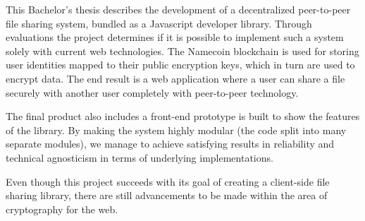 %

This Bachelor's thesis describes the development of a decentralized peer-to-peer file sharing system, bundled as a Javascript developer library. Through evaluations the project determines if it is possible to implement such a system solely with current web technologies. The Namecoin blockchain is used for storing user identities mapped to their public encryption keys, which in turn are used to encrypt data. The end result is a web application where a user can share a file securely with another user completely with peer-to-peer technology.

The final product also includes a front-end prototype is built to show the features of the library. By making the system highly modular (the code split into many separate modules), we manage to achieve satisfying results in reliability and technical agnosticism in terms of underlying implementations.

Even though this project succeeds with its goal of creating a client-side file sharing library, there are still advancements to be made within the area of cryptography for the web.
